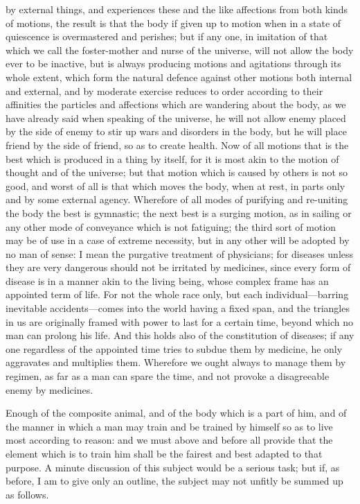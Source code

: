 \documentclass[11pt,letter]{article}
\begin{document}
by external things, and experiences these and the like affections from both kinds of motions, the result is that the body if given up to motion when in a state of quiescence is overmastered and perishes; but if any one, in imitation of that which we call the foster-mother and nurse of the universe, will not allow the body ever to be inactive, but is always producing motions and agitations through its whole extent, which form the natural defence against other motions both internal and external, and by moderate exercise reduces to order according to their affinities the particles and affections which are wandering about the body, as we have already said when speaking of the universe, he will not allow enemy placed by the side of enemy to stir up wars and disorders in the body, but he will place friend by the side of friend, so as to create health. Now of all motions that is the best which is produced in a thing by itself, for it is most akin to the motion of thought and of the universe; but that motion which is caused by others is not so good, and worst of all is that which moves the body, when at rest, in parts only and by some external agency. Wherefore of all modes of purifying and re-uniting the body the best is gymnastic; the next best is a surging motion, as in sailing or any other mode of conveyance which is not fatiguing; the third sort of motion may be of use in a case of extreme necessity, but in any other will be adopted by no man of sense: I mean the purgative treatment of physicians; for diseases unless they are very dangerous should not be irritated by medicines, since every form of disease is in a manner akin to the living being, whose complex frame has an appointed term of life. For not the whole race only, but each individual—barring inevitable accidents—comes into the world having a fixed span, and the triangles in us are originally framed with power to last for a certain time, beyond which no man can prolong his life. And this holds also of the constitution of diseases; if any one regardless of the appointed time tries to subdue them by medicine, he only aggravates and multiplies them. Wherefore we ought always to manage them by regimen, as far as a man can spare the time, and not provoke a disagreeable enemy by medicines.

\par  Enough of the composite animal, and of the body which is a part of him, and of the manner in which a man may train and be trained by himself so as to live most according to reason: and we must above and before all provide that the element which is to train him shall be the fairest and best adapted to that purpose. A minute discussion of this subject would be a serious task; but if, as before, I am to give only an outline, the subject may not unfitly be summed up as follows.
\end{document}
